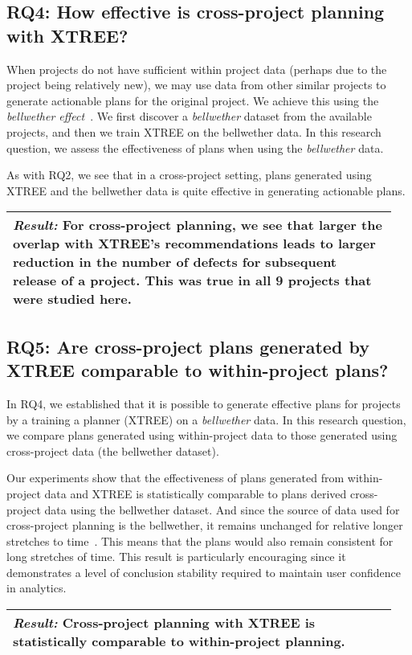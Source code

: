 \documentclass[10pt,journal,compsoc]{IEEEtran}
\newcommand{\result}[1]{
\vspace{0.2cm}
\noindent\begin{minipage}{\linewidth}
    \begin{tabular}{|p{0.95\linewidth}|}
    	\arrayrulecolor{Gray}
    	\hline\vspace{-0.2cm}
    	\rowcolor{Gray} \textit{\textbf{Result:}} #1\\\hline
    \end{tabular}
\end{minipage}\bigstrut%
}
\begin{document}
\subsection*{RQ4: How effective is cross-project planning with XTREE?}
    
When projects do not have sufficient within project data (perhaps due to the project being relatively new), we may use data from other similar projects to generate actionable plans for the original project. We achieve this using the \textit{bellwether effect}~\cite{krishna17a}. We first discover a \textit{bellwether} dataset from the available projects, and then we train XTREE on the bellwether data. In this research question, we assess the effectiveness of plans when using the \textit{bellwether} data.

As with RQ2, we see that in a cross-project setting, plans generated using XTREE and the bellwether data is quite effective in generating actionable plans. 

\result{For cross-project planning, we see that larger the overlap with XTREE's recommendations leads to larger reduction in the number of defects for subsequent release of a project. This was true in all 9 projects that were studied here.}

\subsection*{RQ5: Are cross-project plans generated by XTREE comparable to within-project plans?}

In RQ4, we established that it is possible to generate effective plans for projects by a training a planner (XTREE) on a \textit{bellwether} data. In this research question, we compare plans generated using within-project data to those generated using cross-project data (the bellwether dataset).

Our experiments show that the effectiveness of plans generated from within-project data and XTREE is statistically comparable to plans derived cross-project data using the bellwether dataset. And since the source of data used for cross-project planning is the bellwether, it remains unchanged for relative longer stretches to time~\cite{krishna17a}. This means that the plans would also remain consistent for long stretches of time. This result is particularly encouraging since it demonstrates a level of conclusion stability required to maintain user confidence in analytics.

\result{Cross-project planning with XTREE is statistically comparable to within-project planning.}
\end{document}
